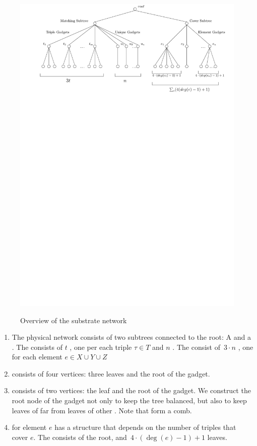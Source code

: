 \begin{figure}[t]
  \centering
  \includegraphics[width=0.99\columnwidth]{reduction/overview.pdf}
  \label{fig:red-ma}
  \vspace{-1em}
  \caption{Overview of the substrate network}
  \vspace{-1em}
\end{figure}


\begin{enumerate}
  \item The physical network consists of two subtrees connected to the
  root: A {\MatchSubtree} and a {\CoverSubtree}. The
  {\MatchSubtree} consists of $t$ {\TripleGadgets}, one per each triple $\tau\in T$ and $n$
  {\UnqGadgets}. The {\CoverSubtree} consist of~$3\cdot n$ {\ElGadgets}, one for each element $e\in X\cup Y\cup Z$
  \item {\TripleGadget} consists of four vertices: three leaves and the root of the gadget.
  \item {\UnqGadget} consists of two vertices: the leaf and the root of the gadget.
  We construct the root node of the gadget not only to keep the tree balanced, but also to keep leaves of
  {\UnqGadgets} far from leaves of other \UnqGadgets. Note that \UnqGadgets{} form a comb.
  \item {\ElGadget} for element $e$ has a structure that depends on the number of triples that cover $e$. The {\ElGadget} consists of the
  root, and~$4\cdot(\deg(e)-1)+1$ leaves.
\end{enumerate}

